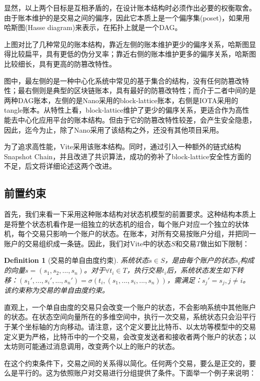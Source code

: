 \documentclass[UTF8,nofonts]{ctexart}
\newtheorem{definition}{Definition}[section]
\begin{document}
\begin{multicols}{2}
显然，以上两个目标是互相矛盾的，在设计账本结构时必须作出必要的权衡取舍。由于账本维护的是交易之间的偏序，因此它本质上是一个偏序集(poset)\cite{poset}，如果用哈斯图(Hasse diagram)\cite{hasse}来表示，在拓扑上就是一个DAG。

上图对比了几种常见的账本结构，靠近左侧的账本维护更少的偏序关系，哈斯图显得比较扁平，具有更低的伪分叉率；靠近右侧的账本维护更多的偏序关系，哈斯图比较细长，具有更高的防篡改特性。

图中，最左侧的是一种中心化系统中常见的基于集合的结构，没有任何防篡改特性；最右侧则是典型的区块链账本，具有最好的防篡改特性；而介于二者中间的是两种DAG账本，左侧的是Nano采用的block-lattice账本\cite{nano}，右侧是IOTA采用的tangle账本\cite{iota}。从特性上看，block-lattice维护了更少的偏序关系，更适合作为高性能去中心化应用平台的账本结构。但由于它的防篡改特性较差，会产生安全隐患，因此，迄今为止，除了Nano采用了该结构之外，还没有其他项目采用。

为了追求高性能，Vite采用该账本结构。同时，通过引入一种额外的链式结构Snapshot Chain，并且改进了共识算法，成功的弥补了block-lattice安全性方面的不足，后文将详细论述这两个改进。

\subsection{前置约束}
首先，我们来看一下采用这种账本结构对状态机模型的前置要求。这种结构本质上是将整个状态机看作是一组独立的状态机的组合，每个账户对应一个独立的状体机，每个交易只影响一个账户的状态。在账本，对所有交易按账户分组，并把同一账户的交易组织成一条链。因此，我们对Vite中的状态$S$和交易$T$做出如下限制：

\begin{definition}[交易的单自由度约束]
系统状态$s \in S$，是由每个账户的状态$s_{i}$构成的向量$s=(s_{1}, s_{2},...,s_{n})$。对于$\forall t_{i} \in T$，执行交易$t_{i}$后，系统状态发生如下转移：$({s_{1}}',..., {s_{i}}',...,{s_{n}}') = \sigma(t_{i}, (s_{1},..., s_{i},...,s_{n}))$，需满足：${s_{j}}'=s_{j} , j \neq i$。该约束称为交易的单自由度约束。
\end{definition}

直观上，一个单自由度的交易只会改变一个账户的状态，不会影响系统中其他账户的状态。在状态空间向量所在的多维空间中，执行一次交易，系统状态只会沿平行于某个坐标轴的方向移动。请注意，这个定义要比比特币、以太坊等模型中的交易定义更为严格，比特币中的一个交易，会改变发送者和接收者两个账户的状态；以太坊则可能通过消息调用，改变两个以上的账户的状态。

在这个约束条件下，交易之间的关系得以简化。任何两个交易，要么是正交的，要么是平行的。这为依照账户对交易进行分组提供了条件。下面举一个例子来说明：


\end{multicols}
\end{document}
